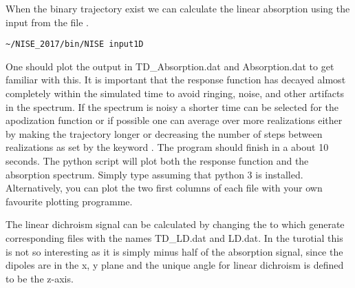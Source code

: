 When the binary trajectory exist we can calculate the linear absorption using the input from the file .
\begin{lstlisting}[style=mystyle]
~/NISE_2017/bin/NISE input1D
\end{lstlisting}
One should plot the output in TD\_Absorption.dat and Absorption.dat to get familiar with this. It is 
important that the response function has decayed almost completely within the simulated 
time to avoid ringing, noise, and other artifacts in the spectrum. 
If the spectrum is noisy a shorter time can be selected for the apodization function or if possible one can average over more realizations either by making the trajectory longer or decreasing the number of steps between realizations as set by the keyword .
The program should finish in a 
about 10 seconds. The python script  will plot both the response function and the absorption spectrum. Simply type  assuming that python 3 is installed. Alternatively, you can plot the two first columns of each file with your own favourite plotting programme.

The linear dichroism signal can be calculated by changing the  to  which generate corresponding files with the names TD\_LD.dat and LD.dat. In the turotial this is 
not so interesting as it is simply minus half of the absorption signal, since the dipoles are in the 
x, y plane and the unique angle for linear dichroism is defined to be the z-axis.

